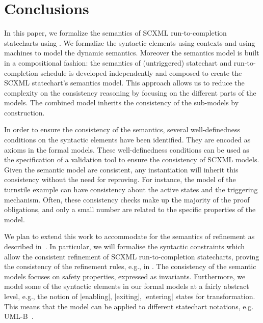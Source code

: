 \section{Conclusions}
\label{sec:conclusions}

In this paper, we formalize the semantics of SCXML run-to-completion statecharts using \EventB. We formalize the syntactic elements using \EventB contexts and using \EventB machines to model the dynamic semantics.  Moreover the semantics model is built in a compositional fashion: the semantics of (untriggered) statechart and run-to-completion schedule is developed independently and composed to create the SCXML statechart's semantics model. This approach allows us to reduce the complexity on the consistency reasoning by focusing on the different parts of the models. The combined model inherits the consistency of the sub-models by construction.

In order to ensure the consistency of the semantics, several well-definedness conditions on the syntactic elements have been identified. They are encoded as axioms in the formal models. These well-definedness conditions can be used as the specification of a validation tool to ensure the consistency of SCXML models. Given the semantic model are consistent, any instantiation will inherit this consistency without the need for reproving. For instance, the model of the turnstile example can have consistency about the active states and the triggering mechanism. Often, these consistency checks make up the majority of the proof  obligations, and only a small number are related to the specific properties of the model.

We plan to extend this work to  accommodate for the semantics of refinement as described in~\cite{Morris2018,Morris2020}. In particular, we will formalise the syntactic constraints which allow the consistent refinement of SCXML run-to-completion statecharts, proving the consistency of the refinement rules, e.g., in \cite{DBLP:journals/isse/MorrisSHHAB22}.  The consistency of the semantic models focuses on safety properties, expressed as invariants. Furthermore, we model some of the syntactic elements in our formal models at a fairly abstract level, e.g., the notion of |enabling|, |exiting|, |entering| states for transformation.  This means that the model can be applied to different statechart notations, e.g. UML-B~\cite{DBLP:conf/sefm/SnookBHFD22}.

